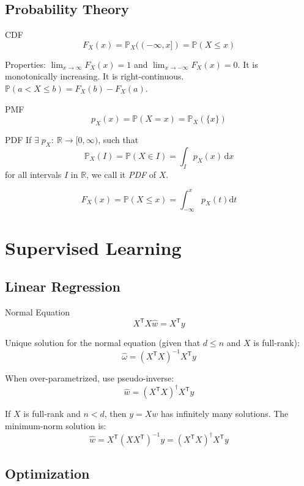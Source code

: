 \documentclass[a4paper,11pt]{article}
\def\R{\mathbb{R}}
\def\P{\mathbb{P}}
\def\T{\mathsf{T}}
\begin{document}
\subsection*{Probability Theory}

\begin{mainbox}{CDF}
    \[
        F_X(x) = \P_X((-\infty, x]) = \P(X \leq x)
    \]
\end{mainbox}
Properties: \( \lim_{x \to \infty} F_X(x) = 1 \) and \( \lim_{x \to -\infty} F_X(x) = 0 \). It is monotonically increasing. It is right-continuous. \( \P(a < X \leq b) = F_X(b) - F_X(a) \).

\begin{mainbox}{PMF}
    \[
        p_X(x) = \P(X = x) = \P_X(\{ x \})
    \]
\end{mainbox}

\begin{mainbox}{PDF}
    If \( \exists \; p_X: \: \R \to [0, \infty) \), such that \[
        \P_X(I) = \P(X \in I) = \int_I p_X(x) \, \mathrm{d}x
    \] for all intervals \( I \) in \( \R \), we call it \emph{PDF} of \( X \).
\end{mainbox}
\[
    F_X(x) = \P(X \leq x) = \int_{-\infty}^x p_X(t) \mathrm{d}t
\]


\section*{Supervised Learning}

\subsection*{Linear Regression}

\begin{subbox}{Normal Equation}
    \[
        X^\T X \hat{w} = X^\T y
    \]
\end{subbox}

Unique solution for the normal equation (given that \( d \leq n \) and \( X \) is full-rank):
\[
    \hat{\omega} = \left( X^\T X \right)^{-1} X^\T y
\]

When over-parametrized, use pseudo-inverse:
\[
    \hat{w} = \left( X^\T X \right)^\dagger X^\T y
\]

If \( X \) is full-rank and \( n < d \), then \( y = Xw \) has infinitely many solutions. The minimum-norm solution is:
\[
    \hat{w} = X^\T \left( X X^\T \right)^{-1} y = \left( X^\T X \right)^\dagger X^\T y
\]


\subsection*{Optimization}
\end{document}
